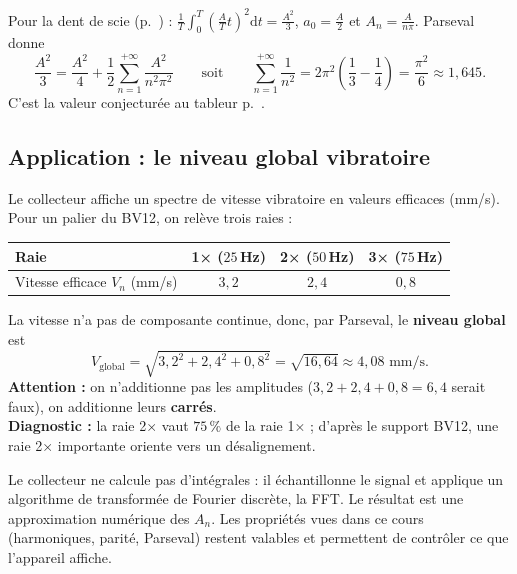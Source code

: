 \documentclass[a4paper,11pt]{article}
\begin{document}
\begin{exemple}\label{ex:basel}
Pour la dent de scie (p.~\pageref{ex:rampe}) : $\frac1T\int_0^T\left(\frac ATt\right)^2\mathrm dt = \frac{A^2}{3}$, $a_0 = \frac A2$ et $A_n = \frac{A}{n\pi}$. Parseval donne
\[
\frac{A^2}{3} = \frac{A^2}{4} + \frac12\sum_{n=1}^{+\infty}\frac{A^2}{n^2\pi^2}
\qquad\text{soit}\qquad
\sum_{n=1}^{+\infty}\frac1{n^2} = 2\pi^2\left(\frac13 - \frac14\right) = \frac{\pi^2}{6}\approx 1{,}645.
\]
C'est la valeur conjecturée au tableur p.~\pageref{ex:riemann}.
\end{exemple}

\subsection{Application : le niveau global vibratoire}\label{subsec:niveauglobal}

\begin{appliindus}\label{ex:niveauglobal}
Le collecteur affiche un spectre de vitesse vibratoire en valeurs efficaces (mm/s). Pour un palier du BV12, on relève trois raies :
\begin{center}
\renewcommand{\arraystretch}{1.3}
\begin{tabular}{|l|c|c|c|}
\hline
\rowcolor{uimmlightblue}
Raie & 1× ($25$\,Hz) & 2× ($50$\,Hz) & 3× ($75$\,Hz) \\
\hline
Vitesse efficace $V_n$ (mm/s) & $3{,}2$ & $2{,}4$ & $0{,}8$ \\
\hline
\end{tabular}
\end{center}
La vitesse n'a pas de composante continue, donc, par Parseval, le \textbf{niveau global} est
\[
V_{\text{global}} = \sqrt{3{,}2^2 + 2{,}4^2 + 0{,}8^2} = \sqrt{16{,}64}\approx 4{,}08 \text{ mm/s.}
\]
\textbf{Attention :} on n'additionne pas les amplitudes ($3{,}2 + 2{,}4 + 0{,}8 = 6{,}4$ serait faux), on additionne leurs \textbf{carrés}.\\
\textbf{Diagnostic :} la raie 2× vaut $75\,\%$ de la raie 1× ; d'après le support BV12, une raie 2× importante oriente vers un désalignement.
\end{appliindus}

\begin{remarque}[-- Et la FFT ?]
Le collecteur ne calcule pas d'intégrales : il échantillonne le signal et applique un algorithme de transformée de Fourier discrète, la FFT. Le résultat est une approximation numérique des $A_n$. Les propriétés vues dans ce cours (harmoniques, parité, Parseval) restent valables et permettent de contrôler ce que l'appareil affiche.
\end{remarque}
\end{document}
